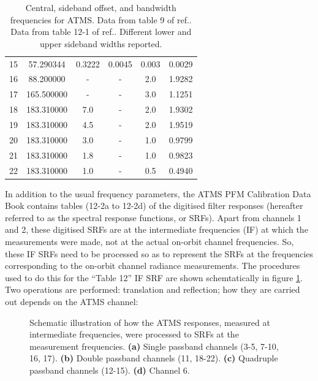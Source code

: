 \begin{table}[htp]
\begin{tabular}{c c c c c c}
           15        &  57.290344  & 0.3222 & 0.0045 & 0.003  & 0.0029        \\
           16        &  88.200000  & -      & -      & 2.0    & 1.9282        \\
           17        & 165.500000  & -      & -      & 3.0    & 1.1251        \\
           18        & 183.310000  & 7.0    & -      & 2.0    & 1.9302        \\
           19        & 183.310000  & 4.5    & -      & 2.0    & 1.9519        \\
           20        & 183.310000  & 3.0    & -      & 1.0    & 0.9799        \\
           21        & 183.310000  & 1.8    & -      & 1.0    & 0.9823        \\
           22        & 183.310000  & 1.0    & -      & 0.5    & 0.4940        \\
    \hline
  \end{tabular}
  \caption{Central, sideband offset, and bandwidth frequencies for ATMS. Data from table 9 of ref.\cite{CrIS_EDR_ATBD}. Data from table 12-1 of ref.\cite{ATMS_PFM_CalLog}. Different lower and upper sideband widths reported. }
  \label{tab:atms_fo_sb_and_df}
\end{table}

In addition to the usual frequency parameters, the ATMS PFM Calibration Data Book\cite{ATMS_PFM_CalLog} contains tables (12-2a to 12-2d) of the digitised filter responses (hereafter referred to as the spectral response functions, or SRFs). Apart from channels 1 and 2, these digitised SRFs are at the intermediate frequencies (IF) at which the measurements were made, not at the actual on-orbit channel frequencies. So, these IF SRFs need to be processed so as to represent the SRFs at the frequencies corresponding to the on-orbit channel radiance measurements. The procedures used to do this for the ``Table 12'' IF SRF are shown schemtatically in figure \ref{fig:r_and_s}. Two operations are performed: translation and reflection; how they are carried out depends on the ATMS channel:

\begin{figure}[htp]
  \centering
  
  \caption{Schematic illustration of how the ATMS responses, measured at intermediate frequencies, were processed to SRFs at the measurement frequencies. \textbf{(a)} Single passband channels (3-5, 7-10, 16, 17). \textbf{(b)} Double passband channels (11, 18-22). \textbf{(c)} Quadruple passband channels (12-15). \textbf{(d)} Channel 6.}
  \label{fig:r_and_s}
\end{figure}

